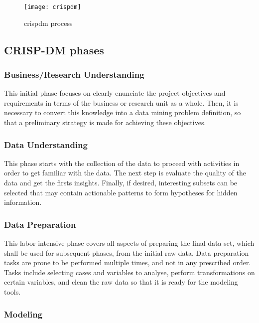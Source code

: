 \begin{figure}[htbp]
	\centering
	\texttt{[image: crispdm]}
	\caption{\Acrshort{crispdm} process}
	\label{fig:crispdm}
\end{figure}

\subsection{CRISP-DM phases}
\label{subsec:crispdm_phases}

\subsubsection{Business/Research Understanding}
\label{subsubsec:business_understanding}

This initial phase focuses on clearly enunciate the project objectives and requirements in terms of the business or research unit as a whole. Then, it is necessary to convert this knowledge into a data mining problem definition, so that a preliminary strategy is made for achieving these objectives.

\subsubsection{Data Understanding}

This phase starts with the collection of the data to proceed with activities in order to get familiar with the data. The next step is evaluate the quality of the data and get the firsts insights. Finally, if desired, interesting subsets can be selected that may contain actionable patterns to form hypotheses for hidden information.

\subsubsection{Data Preparation}

This labor-intensive phase covers all aspects of preparing the final data set, which shall be used for subsequent phases, from the initial raw data. Data preparation tasks are prone to be performed multiple times, and not in any prescribed order. Tasks include selecting cases and variables to analyse, perform transformations on certain variables, and clean the raw data so that it is ready for the modeling tools.

\subsubsection{Modeling}

